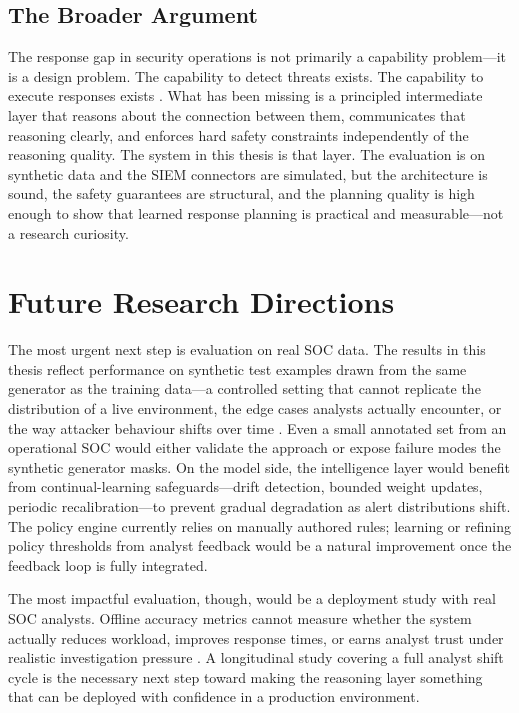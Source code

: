 \subsection{The Broader Argument}

The response gap in security operations is not primarily a capability problem---it is a design problem. The capability to detect threats exists. The capability to execute responses exists \cite{nist80092, nist80061}. What has been missing is a principled intermediate layer that reasons about the connection between them, communicates that reasoning clearly, and enforces hard safety constraints independently of the reasoning quality. The system in this thesis is that layer. The evaluation is on synthetic data and the SIEM connectors are simulated, but the architecture is sound, the safety guarantees are structural, and the planning quality is high enough to show that learned response planning is practical and measurable---not a research curiosity.

\section{Future Research Directions}

The most urgent next step is evaluation on real SOC data. The results in this thesis reflect performance on synthetic test examples drawn from the same generator as the training data---a controlled setting that cannot replicate the distribution of a live environment, the edge cases analysts actually encounter, or the way attacker behaviour shifts over time \cite{sommer2010outside, tilbury2024humans}. Even a small annotated set from an operational SOC would either validate the approach or expose failure modes the synthetic generator masks. On the model side, the intelligence layer would benefit from continual-learning safeguards---drift detection, bounded weight updates, periodic recalibration---to prevent gradual degradation as alert distributions shift. The policy engine currently relies on manually authored rules; learning or refining policy thresholds from analyst feedback would be a natural improvement once the feedback loop is fully integrated.

The most impactful evaluation, though, would be a deployment study with real SOC analysts. Offline accuracy metrics cannot measure whether the system actually reduces workload, improves response times, or earns analyst trust under realistic investigation pressure \cite{tilbury2024humans, ban2023alertfatigue}. A longitudinal study covering a full analyst shift cycle is the necessary next step toward making the reasoning layer something that can be deployed with confidence in a production environment.

